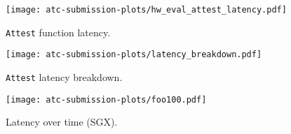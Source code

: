 \begin{figure*}[t!]
    \centering
     \vspace{-3mm}
    \texttt{[image: atc-submission-plots/hw\_eval\_attest\_latency.pdf]} 
  \caption{{\tt Attest} function latency.}
  \label{fig:attest_kernel}
\endminipage
{}
    \centering
     \vspace{-3mm}
  \texttt{[image: atc-submission-plots/latency\_breakdown.pdf]}
  \caption{{\tt Attest} latency breakdown.}\label{fig:latency_breakdown}
\endminipage
{}
    \centering
  \texttt{[image: atc-submission-plots/foo100.pdf]}
    \vspace{-7mm}
  \caption{Latency over time (SGX).}\label{fig:latency_distribution}
\endminipage
\vspace{-3mm}
\end{figure*}
